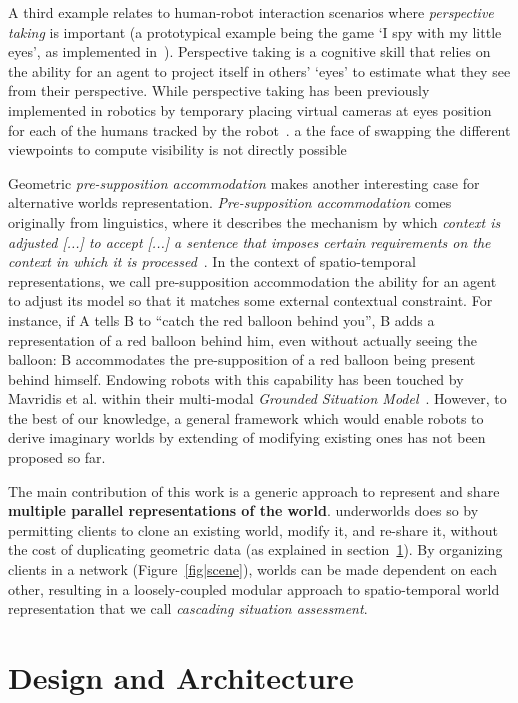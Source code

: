 \documentclass[letterpaper, 10 pt, conference]{ieeeconf}  %
\newcommand{\etal}{et al.\xspace}
\newcommand{\uwds}{{\sc underworlds}\xspace}
\begin{document}
A third example relates to human-robot interaction scenarios where \emph{perspective
taking} is important (a prototypical example being the game `I spy with my
little eyes', as implemented in~\cite{ros2010which}). Perspective taking is a
cognitive skill that relies on the ability for an agent to project itself in
others' `eyes' to estimate what they see from their perspective. While
perspective taking has been previously implemented in robotics by temporary placing
virtual cameras at eyes position for each of the humans tracked by the
robot~\cite{ros2010solving}. a the face of  swapping the different viewpoints
to compute visibility is not directly possible

Geometric \emph{pre-supposition accommodation} makes another interesting case
for alternative worlds representation. \emph{Pre-supposition accommodation}
comes originally from linguistics, where it describes the mechanism by which
\emph{context is adjusted [...] to accept [...] a sentence that imposes certain
requirements on the context in which it is
processed}~\cite{vonfintel2008presupposition}. In the context of spatio-temporal
representations, we call pre-supposition accommodation the ability for an agent
to adjust its model so that it matches some external contextual constraint. For
instance, if A tells B to ``catch the red balloon behind you'', B adds a
representation of a red balloon behind him, even without actually seeing the
balloon: B accommodates the pre-supposition of a red balloon being present
behind himself. Endowing robots with this capability has been touched by
Mavridis \etal within their multi-modal \emph{Grounded Situation
Model}~\cite{Mavridis2006}. However, to the best of our knowledge, a general
framework which would enable robots to derive imaginary worlds by extending of
modifying existing ones has not been proposed so far.


The main contribution of this work is a generic approach to represent and share
\textbf{multiple parallel representations of the world}. \uwds does so by
permitting clients to clone an existing world, modify it, and re-share it,
without the cost of duplicating geometric data (as explained in
section~\ref{design}). By organizing clients in a network
(Figure~\ref{fig|scene}), worlds can be made dependent on each other, resulting
in a loosely-coupled modular approach to spatio-temporal world representation
that we call \emph{cascading situation assessment}.


\section{Design and Architecture}
\label{design}
\end{document}
